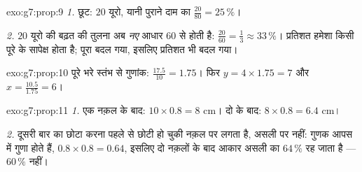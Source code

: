 \begin{solution}{exo:g7:prop:9}
\emph{1.} छूट: $20$ यूरो, यानी पुराने दाम का
$\frac{20}{80} = 25\,\%$।

\emph{2.} $20$ यूरो की बढ़त की तुलना अब \emph{नए} आधार $60$ से
होती है: $\frac{20}{60} = \frac13 \approx 33\,\%$। प्रतिशत हमेशा
किसी पूरे के सापेक्ष होता है; पूरा बदल गया, इसलिए प्रतिशत भी बदल
गया।
\end{solution}

\begin{solution}{exo:g7:prop:10}
पूरे भरे स्तंभ से गुणांक: $\frac{17.5}{10} = 1.75$। फिर
$y = 4 \times 1.75 = 7$ और $x = \frac{10.5}{1.75} = 6$।
\end{solution}

\begin{solution}{exo:g7:prop:11}
\emph{1.} एक नक़ल के बाद: $10 \times 0.8 = 8$ cm। दो के बाद:
$8 \times 0.8 = 6.4$ cm।

\emph{2.} दूसरी बार का छोटा करना पहले से छोटी हो चुकी नक़ल पर लगता
है, असली पर नहीं: गुणक आपस में गुणा होते हैं,
$0.8 \times 0.8 = 0.64$, इसलिए दो नक़लों के बाद आकार असली का
$64\,\%$ रह जाता है --- $60\,\%$ नहीं।
\end{solution}

